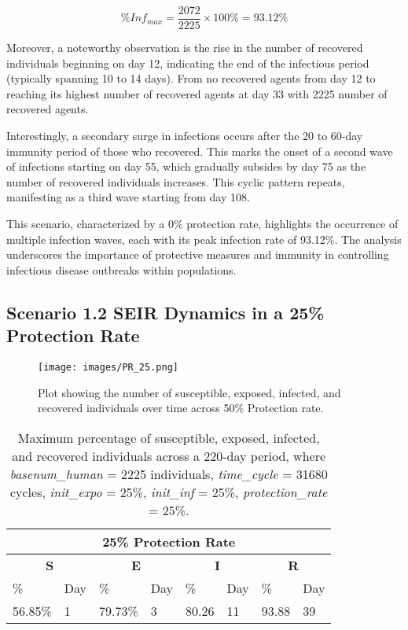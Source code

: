 \[
\%Inf_{max} = \frac{2072}{2225} \times 100\%  = 93.12\%
\]

Moreover, a noteworthy observation is the rise in the number of recovered individuals beginning on day 12, indicating the end of the infectious period (typically spanning 10 to 14 days). From no recovered agents from day 12 to reaching its highest number of recovered agents at day 33 with 2225 number of recovered agents. 

Interestingly, a secondary surge in infections occurs after the 20 to 60-day immunity period of those who recovered. This marks the onset of a second wave of infections starting on day 55, which gradually subsides by day 75 as the number of recovered individuals increases. This cyclic pattern repeats, manifesting as a third wave starting from day 108.

This scenario, characterized by a 0\% protection rate, highlights the occurrence of multiple infection waves, each with its peak infection rate of 93.12\%. The analysis underscores the importance of protective measures and immunity in controlling infectious disease outbreaks within populations. 

\subsection{ Scenario 1.2 SEIR Dynamics in a 25\% Protection Rate}

\begin{figure}[H]
	\centering
	\texttt{[image: images/PR\_25.png]}
	\caption{Plot showing the number of susceptible, exposed, infected, and recovered individuals over time across 50\% Protection rate. }
	\label{fig:11b}
\end{figure}

\begin{table} [H]
	\centering
	{\begin{tabular}{|l|l|l|l|l|l|l|l|}
		\hline
		\multicolumn{8}{|c|}{\textbf{25\% Protection Rate}}\\
		\hline
		\multicolumn{2}{|c|}{\textbf{S}} &  \multicolumn{2}{c|}{\textbf{E}}&  \multicolumn{2}{c|}{\textbf{I}}&  \multicolumn{2}{c|}{\textbf{R}}\\
		\hline
		\%& Day & \% & Day & \%  & Day & \% & Day \\
		\hline
		56.85\% & 1 & 79.73\%  & 3 &  80.26  & 11 & 93.88  &39 \\
		\hline
	\end{tabular}
	\caption{Maximum percentage of susceptible, exposed, infected, and recovered individuals across a 220-day period, where \textit{basenum\_human} = 2225 individuals, \textit{time\_cycle} = 31680 cycles, \textit{init\_expo} = 25\%, \textit{init\_inf} = 25\%,  \textit{protection\_rate} = 25\%.}}
	\label{PR2_Max}
\end{table}

